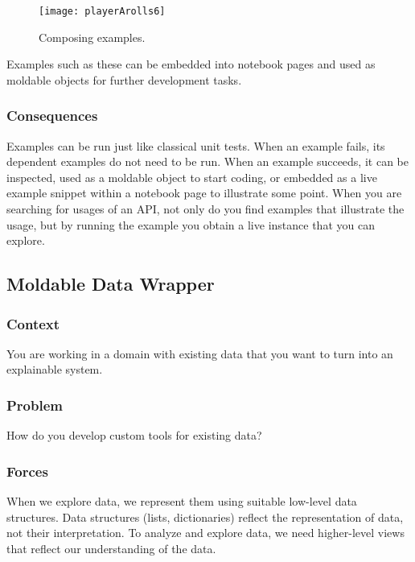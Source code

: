\documentclass[sigconf]{acmart}
\begin{document}
\begin{figure}[h]
  \texttt{[image: playerArolls6]}
  \caption{Composing examples.}
  \label{fig:playerArolls6}
\end{figure}

Examples such as these can be embedded into notebook pages and used as moldable objects for further development tasks.
    
\subsubsection*{Consequences}
Examples can be run just like classical unit tests.
When an example fails, its dependent examples do not need to be run.
When an example succeeds, it can be inspected, used as a moldable object to start coding, or embedded as a live example snippet within a notebook page to illustrate some point.
When you are searching for usages of an API, not only do you find examples that illustrate the usage, but by running the example you obtain a live instance that you can explore.

\subsection*{Moldable Data Wrapper}\label{pat:moldableDataWrapper}
\subsubsection*{Context}
You are working in a domain with existing data that you want to turn into an explainable system.

\subsubsection*{Problem}
How do you develop custom tools for existing data?

\subsubsection*{Forces}
When we explore data, we represent them using suitable low-level data structures.
Data structures (lists, dictionaries) reflect the representation of data, not their interpretation.
To analyze and explore data, we need higher-level views that reflect our understanding of the data.
\end{document}
